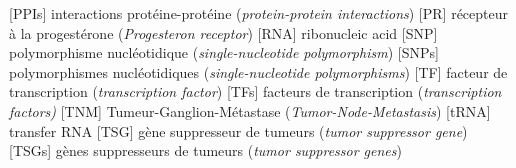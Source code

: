 \begin{acronym}[CDKN2A]
					{interactions protéine-protéine (\emph{protein-protein interactions})}
						[PR]		{récepteur à la progestérone (\emph{Progesteron receptor})}
						[RNA]		{ribonucleic acid}
						[SNP]		{polymorphisme nucléotidique (\emph{single-nucleotide polymorphism})}
					{polymorphismes nucléotidiques (\emph{single-nucleotide polymorphisms})}
						[TF]		{facteur de transcription (\emph{transcription factor})}
					{facteurs de transcription (\emph{transcription factors)}}
						[TNM]		{Tumeur-Ganglion-Métastase (\emph{Tumor-Node-Metastasis})}
						[tRNA]		{transfer \ac{RNA}}
						[TSG]		{gène suppresseur de tumeurs (\emph{tumor suppressor gene})}
					{gènes suppresseurs de tumeurs (\emph{tumor suppressor genes})}
		\end{acronym}

